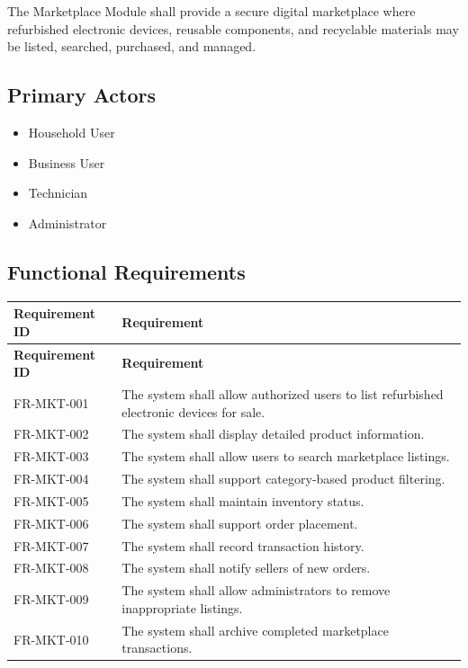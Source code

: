 The Marketplace Module shall provide a secure digital marketplace where
refurbished electronic devices, reusable components, and recyclable
materials may be listed, searched, purchased, and managed.

\subsection{Primary Actors}

\begin{itemize}
\item Household User
\item Business User
\item Technician
\item Administrator
\end{itemize}

\subsection{Functional Requirements}

\begin{longtable}{|p{3cm}|p{10.2cm}|}

\hline
\textbf{Requirement ID} &
\textbf{Requirement} \\
\hline
\endfirsthead

\hline
\textbf{Requirement ID} &
\textbf{Requirement} \\
\hline
\endhead

FR-MKT-001 &
The system shall allow authorized users to list refurbished electronic devices for sale.\\
\hline

FR-MKT-002 &
The system shall display detailed product information.\\
\hline

FR-MKT-003 &
The system shall allow users to search marketplace listings.\\
\hline

FR-MKT-004 &
The system shall support category-based product filtering.\\
\hline

FR-MKT-005 &
The system shall maintain inventory status.\\
\hline

FR-MKT-006 &
The system shall support order placement.\\
\hline

FR-MKT-007 &
The system shall record transaction history.\\
\hline

FR-MKT-008 &
The system shall notify sellers of new orders.\\
\hline

FR-MKT-009 &
The system shall allow administrators to remove inappropriate listings.\\
\hline

FR-MKT-010 &
The system shall archive completed marketplace transactions.\\
\hline

\end{longtable}

